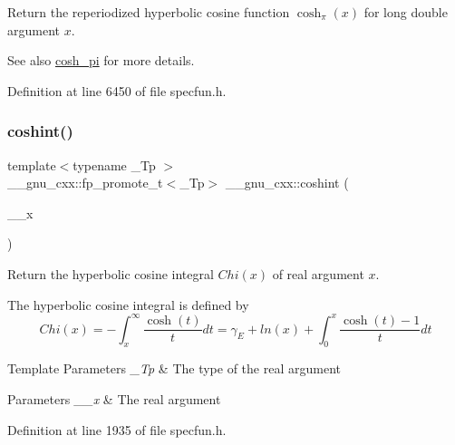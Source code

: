 Return the reperiodized hyperbolic cosine function $ \cosh_\pi(x) $ for {\ttfamily long double} argument $ x $.

\begin{DoxySeeAlso}{See also}
\hyperlink{group__gnu__math__spec__func_gaf59c68a01adfdab0f22c4fb405ab2a36}{cosh\+\_\+pi} for more details. 
\end{DoxySeeAlso}


Definition at line 6450 of file specfun.\+h.

\mbox{\label{group__gnu__math__spec__func_ga2411d513d418180285ace6650c7b7e31}} 
\subsubsection{\texorpdfstring{coshint()}{coshint()}}
{\footnotesize\ttfamily template$<$typename \+\_\+\+Tp $>$ \\
\+\_\+\+\_\+gnu\+\_\+cxx\+::fp\+\_\+promote\+\_\+t$<$\+\_\+\+Tp$>$ \+\_\+\+\_\+gnu\+\_\+cxx\+::coshint (\begin{DoxyParamCaption}\item[{\+\_\+\+Tp}]{\+\_\+\+\_\+x }\end{DoxyParamCaption})\hspace{0.3cm}{\ttfamily [inline]}}

Return the hyperbolic cosine integral $ Chi(x) $ of real argument $ x $.

The hyperbolic cosine integral is defined by \[ Chi(x) = -\int_x^\infty \frac{\cosh(t)}{t}dt = \gamma_E + ln(x) + \int_0^x \frac{\cosh(t)-1}{t}dt \]


\begin{DoxyTemplParams}{Template Parameters}
{\em \+\_\+\+Tp} & The type of the real argument \\
\hline
\end{DoxyTemplParams}

\begin{DoxyParams}{Parameters}
{\em \+\_\+\+\_\+x} & The real argument \\
\hline
\end{DoxyParams}


Definition at line 1935 of file specfun.\+h.

